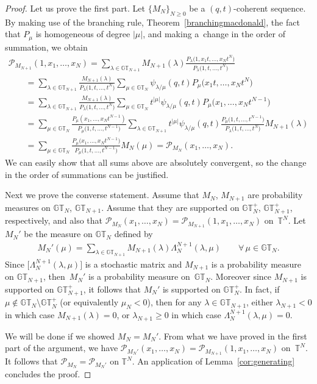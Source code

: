 \documentclass[pdftex]{sigma}
\numberwithin{equation}{section}
\newcommand{\GT}{\mathbb{GT}}
\newcommand{\GTp}{\mathbb{GT}^+}
\newcommand{\PPP}{\mathcal{P}}
\newcommand{\TT}{\mathbb{T}}
\begin{document}
\begin{proof}
Let us prove the f\/irst part. Let $\{M_N\}_{N\geq 0}$ be a $(q, t)$-coherent sequence. By making use of the branching rule, Theorem~\ref{branchingmacdonald}, the fact that $P_{\mu}$ is homogeneous of degree $|\mu|$, and making a~change in the order of summation, we obtain
\begin{gather*}
\PPP_{M_{N+1}}(1, x_1, \dots, x_N) = \sum_{\lambda\in\GT_{N+1}}{M_{N+1}(\lambda)\frac{P_{\lambda}\big(1, x_1t, \dots, x_Nt^{N}\big)}{P_{\lambda}\big(1, t, \dots, t^N\big)}}\\
\qquad{} = \sum_{\lambda\in\GT_{N+1}}{\frac{M_{N+1}(\lambda)}{P_{\lambda}\big(1, t, \dots, t^N\big)} \sum_{\mu\in\GT_N}{\psi_{\lambda/\mu}(q, t) P_{\mu}\big(x_1t, \dots, x_Nt^{N}\big) } }\\
\qquad{} = \sum_{\lambda\in\GT_{N+1}}{\frac{M_{N+1}(\lambda)}{P_{\lambda}\big(1, t, \dots, t^N\big)} \sum_{\mu\in\GT_N}{t^{|\mu|} \psi_{\lambda/\mu}(q, t) P_{\mu}\big(x_1, \dots, x_Nt^{N-1}\big) } }\\
\qquad{} = \sum_{\mu\in\GT_N}{ \frac{P_{\mu}(x_1, \dots, x_Nt^{N-1})}{P_{\mu}\big(1, t, \dots, t^{N-1}\big)} \sum_{\lambda\in\GT_{N+1}}{t^{|\mu|} \psi_{\lambda/\mu}(q, t) \frac{P_{\mu}\big(1, t, \dots, t^{N-1}\big)}{P_{\lambda}\big(1, t, \dots, t^N\big)}M_{N+1}(\lambda) } }\\
\qquad{} = \sum_{\mu\in\GT_N}{ \frac{P_{\mu}\big(x_1, \dots, x_Nt^{N-1}\big)}{P_{\mu}\big(1, t, \dots, t^{N-1}\big)} M_N(\mu) } = \mathcal{P}_{M_N}(x_1, \dots, x_N).
\end{gather*}
We can easily show that all sums above are absolutely convergent, so the change in the order of summations can be justif\/ied.

Next we prove the converse statement. Assume that $M_{N}$, $M_{N+1}$ are probability measures on $\GT_{N}$, $\GT_{N+1}$. Assume that they are supported on $\GTp_N$, $\GTp_{N+1}$, respectively, and also that $\PPP_{M_N}(x_1, \dots, x_N) = \PPP_{M_{N+1}}(1, x_1, \dots, x_N)$ on~$\TT^N$. Let~$M_N'$ be the measure on $\GT_N$ def\/ined by
\begin{gather*}
M_N'(\mu) = \sum_{\lambda\in\GT_{N+1}}{M_{N+1}(\lambda)\Lambda^{N+1}_N(\lambda, \mu)} \qquad \forall\, \mu\in\GT_N.
\end{gather*}
Since $\big[\Lambda^{N+1}_N(\lambda, \mu)\big]$ is a stochastic matrix and $M_{N+1}$ is a probability measure on $\GT_{N+1}$, then~$M_N'$ is a probability measure on~$\GT_N$. Moreover since $M_{N+1}$ is supported on $\GTp_{N+1}$, it follows that $M_N'$ is supported on $\GTp_N$. In fact, if $\mu\notin\GT_N \setminus \GTp_N$ (or equivalently $\mu_N < 0$), then for any $\lambda\in\GT_{N+1}$, either $\lambda_{N+1} < 0$ in which case $M_{N+1}(\lambda) = 0$, or $\lambda_{N+1} \geq 0$ in which case $\Lambda^{N+1}_N(\lambda, \mu) = 0$.

We will be done if we showed $M_N = M_N'$. From what we have proved in the f\/irst part of the argument, we have $\PPP_{M_N'}(x_1, \dots, x_N) = \PPP_{M_{N+1}}(1, x_1, \dots, x_N)$ on~$\TT^N$.
It follows that $\PPP_{M_N} = \PPP_{M_N'}$ on $\TT^N$.
An application of Lemma~\ref{cor:generating} concludes the proof.
\end{proof}
\end{document}
